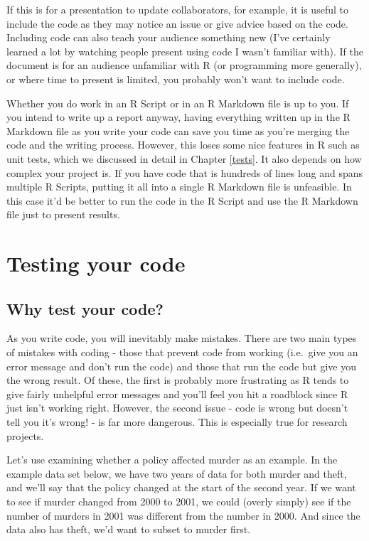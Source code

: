\documentclass[
  12pt,
]{book}
\begin{document}
If this is for a presentation to update collaborators, for example, it is useful to include the code as they may notice an issue or give advice based on the code. Including code can also teach your audience something new (I've certainly learned a lot by watching people present using code I wasn't familiar with). If the document is for an audience unfamiliar with R (or programming more generally), or where time to present is limited, you probably won't want to include code.

Whether you do work in an R Script or in an R Markdown file is up to you. If you intend to write up a report anyway, having everything written up in the R Markdown file as you write your code can save you time as you're merging the code and the writing process. However, this loses some nice features in R such as unit tests, which we discussed in detail in Chapter \ref{tests}. It also depends on how complex your project is. If you have code that is hundreds of lines long and spans multiple R Scripts, putting it all into a single R Markdown file is unfeasible. In this case it'd be better to run the code in the R Script and use the R Markdown file just to present results.

\hypertarget{testing-your-code}{%
\chapter{Testing your code}\label{testing-your-code}}

\hypertarget{why-test-your-code}{%
\section{Why test your code?}\label{why-test-your-code}}

As you write code, you will inevitably make mistakes. There are two main types of mistakes with coding - those that prevent code from working (i.e.~give you an error message and don't run the code) and those that run the code but give you the wrong result. Of these, the first is probably more frustrating as R tends to give fairly unhelpful error messages and you'll feel you hit a roadblock since R just isn't working right. However, the second issue - code is wrong but doesn't tell you it's wrong! - is far more dangerous. This is especially true for research projects.

Let's use examining whether a policy affected murder as an example. In the example data set below, we have two years of data for both murder and theft, and we'll say that the policy changed at the start of the second year. If we want to see if murder changed from 2000 to 2001, we could (overly simply) see if the number of murders in 2001 was different from the number in 2000. And since the data also has theft, we'd want to subset to murder first.
\end{document}

